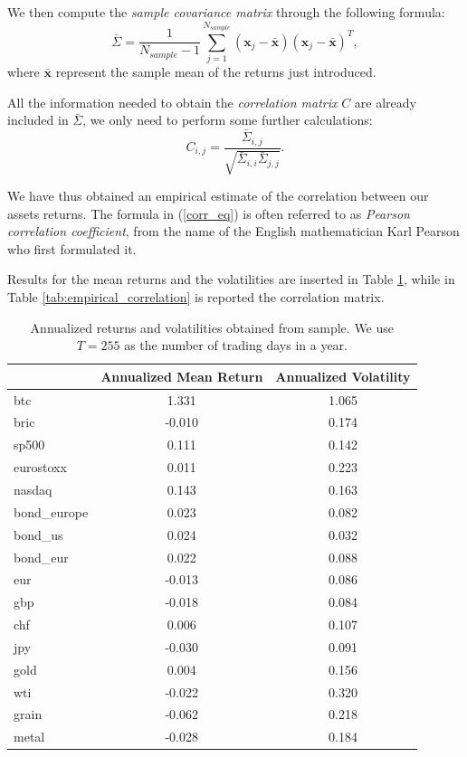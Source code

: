 We then compute the \textit{sample covariance matrix} through the following formula:
\begin{equation*}
\bar{\Sigma}  = \frac{1}{N_{sample}-1} \sum_{j=1}^{N_{sample}} (\mathbf{x}_j - \mathbf{\bar{x}}) (\mathbf{x}_j - \mathbf{\bar{x}})^T,
\end{equation*}
where $\mathbf{\bar{x}}$ represent the sample mean of the returns just introduced.
	
All the information needed to obtain the \textit{correlation matrix} $C$ are already included in $\bar{\Sigma}$, we only need to perform some further calculations:
\begin{equation}
\label{corr_eq}
	C_{i,j} = \frac{\bar{\Sigma}_{i,j}}{\sqrt{\bar{\Sigma}_{i,i} \bar{\Sigma}_{j,j}}}.
\end{equation}

We have thus obtained an empirical estimate of the correlation between our assets returns. The formula in (\ref{corr_eq}) is often referred to as \textit{Pearson correlation coefficient}, from the name of the English mathematician Karl Pearson who first formulated it.

Results for the mean returns and the volatilities are inserted in Table \ref{tab:sample_ret_vol}, while in Table \ref{tab:empirical_correlation} is reported the correlation matrix.


\begin{table}
	\small
	\centering
	\caption[Annualized mean returns and volatilities from sample]{Annualized returns and volatilities obtained from sample. We use $T = 255$ as the number of trading days in a year.}
	\label{tab:sample_ret_vol}
	\begin{tabular}{lcc}
		& Annualized Mean Return & Annualized Volatility \\
		\midrule
		btc & 1.331 & 1.065 \\
		bric & -0.010 & 0.174 \\
		sp500 & 0.111 & 0.142 \\
		eurostoxx & 0.011 & 0.223 \\
		nasdaq & 0.143 & 0.163 \\
		bond\_europe & 0.023 & 0.082 \\
		bond\_us & 0.024 & 0.032 \\
		bond\_eur & 0.022 & 0.088 \\
		eur & -0.013 & 0.086 \\
		gbp & -0.018 & 0.084 \\
		chf & 0.006 & 0.107 \\
		jpy & -0.030 & 0.091 \\
		gold & 0.004 & 0.156 \\
		wti & -0.022 & 0.320 \\
		grain & -0.062 & 0.218 \\
		metal & -0.028 & 0.184 \\
		\midrule
	\end{tabular}
\end{table}

